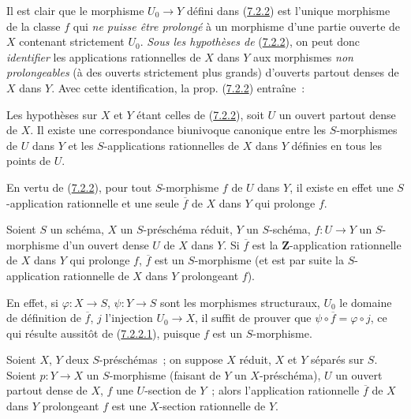 Il est clair que le morphisme $U_0\to Y$ défini dans
(\hyperref[I.7.2.2-fr]{7.2.2}) est l'unique morphisme de la classe $f$ qui
\emph{ne puisse être prolongé} à un morphisme d'une partie ouverte de $X$
contenant strictement $U_0$. \emph{Sous les hypothèses de}
(\hyperref[I.7.2.2-fr]{7.2.2}), on peut donc \emph{identifier} les
applications rationnelles de $X$ dans $Y$ aux morphismes \emph{non
prolongeables} (à des ouverts strictement plus grands) d'ouverts partout
denses de $X$ dans $Y$. Avec cette identification, la prop.
(\hyperref[I.7.2.2-fr]{7.2.2}) entraîne~:

\begin{corollary}[7.2.3]
\label{I.7.2.3-fr}
Les hypothèses sur $X$ et $Y$ étant celles de
\textup{(\hyperref[I.7.2.2-fr]{7.2.2})}, soit $U$ un ouvert partout dense de $X$. Il
existe une correspondance biunivoque canonique entre les $S$-morphismes de
$U$ dans $Y$ et les $S$-applications rationnelles de $X$ dans $Y$ définies
en tous les points de $U$.
\end{corollary}

En vertu de (\hyperref[I.7.2.2-fr]{7.2.2}), pour tout $S$-morphisme $f$ de
$U$ dans $Y$, il existe en effet une $S$-application rationnelle et une seule
$\overline f$ de $X$ dans $Y$ qui prolonge $f$.

\begin{corollary}[7.2.4]
\label{I.7.2.4-fr}
Soient $S$ un schéma, $X$ un $S$-préschéma réduit, $Y$ un $S$-schéma,
$f:U\to Y$ un $S$-morphisme d'un ouvert dense $U$ de $X$ dans $Y$. Si
$\overline f$ est la $\mathbf{Z}$-application rationnelle de $X$ dans $Y$ qui
prolonge $f$, $\overline f$ est un $S$-morphisme (et est par suite la
$S$-application rationnelle de $X$ dans $Y$ prolongeant $f$).
\end{corollary}

En effet, si $\varphi:X\to S$, $\psi:Y\to S$ sont les morphismes structuraux,
$U_0$ le domaine de définition de $\overline f$, $j$ l'injection $U_0\to X$,
il suffit de prouver que $\psi\circ\overline f=\varphi\circ j$, ce qui résulte
aussitôt de (\hyperref[I.7.2.2.1-fr]{7.2.2.1}), puisque $f$ est un
$S$-morphisme.

\begin{corollary}[7.2.5]
\label{I.7.2.5-fr}
Soient $X$, $Y$ deux $S$-préschémas~; on suppose $X$ réduit, $X$ et $Y$
séparés sur $S$. Soient $p:Y\to X$ un $S$-morphisme (faisant de $Y$ un
$X$-préschéma), $U$ un ouvert partout dense de $X$, $f$ une $U$-section de
$Y$~; alors l'application rationnelle $\overline f$ de $X$ dans $Y$
prolongeant $f$ est une $X$-section rationnelle de $Y$.
\end{corollary}

